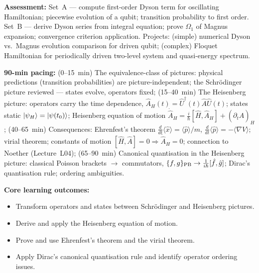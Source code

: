 \documentclass[11pt,a4paper]{article}
\begin{document}
\begin{tcolorbox}[modulebox, title={Module~I.3 / L06: Time Evolution II --- Time-Dependent and Non-Commuting Hamiltonians}]
\medskip\textbf{Assessment:}
Set~A --- compute first-order Dyson term for oscillating Hamiltonian;
piecewise evolution of a qubit; transition probability to first order.
Set~B --- derive Dyson series from integral equation; prove $\Omega_1$ of
Magnus expansion; convergence criterion application.
Projects: (simple) numerical Dyson vs.\ Magnus evolution comparison for driven qubit;
(complex) Floquet Hamiltonian for periodically driven two-level system and
quasi-energy spectrum.
\end{tcolorbox}

\medskip
\begin{tcolorbox}[modulebox, title={Module~I.3 / L07: Pictures of Quantum Mechanics and the Heisenberg Picture}]
\textbf{90-min pacing:} (0--15~min) The equivalence-class of pictures:
physical predictions (transition probabilities) are picture-independent;
the Schr\"odinger picture reviewed --- states evolve, operators fixed;
(15--40~min) The Heisenberg picture: operators carry the time dependence,
$\hat{A}_H(t)=\hat{U}^\dagger(t)\hat{A}\hat{U}(t)$; states static
$\ket{\psi_H}=\ket{\psi(t_0)}$; Heisenberg equation of motion
$\dot{\hat{A}}_H = \tfrac{i}{\hbar}[\hat{H},\hat{A}_H]+(\partial_t\hat{A})_H$;
(40--65~min) Consequences: Ehrenfest's theorem
$\tfrac{d}{dt}\langle\hat{x}\rangle=\langle\hat{p}\rangle/m$,
$\tfrac{d}{dt}\langle\hat{p}\rangle=-\langle\nabla V\rangle$;
virial theorem; constants of motion $[\hat{H},\hat{A}]=0\Rightarrow\dot{\hat{A}}_H=0$;
connection to Noether (Lecture~L04);
(65--90~min) Canonical quantisation in the Heisenberg picture:
classical Poisson brackets $\to$ commutators,
$\{f,g\}_{\rm PB}\to\tfrac{1}{i\hbar}[\hat{f},\hat{g}]$;
Dirac's quantisation rule; ordering ambiguities.

\medskip\textbf{Core learning outcomes:}
\begin{itemize}[leftmargin=1.4em,topsep=2pt,itemsep=1pt]
  \item Transform operators and states between Schr\"odinger and Heisenberg pictures.
  \item Derive and apply the Heisenberg equation of motion.
  \item Prove and use Ehrenfest's theorem and the virial theorem.
  \item Apply Dirac's canonical quantisation rule and identify operator ordering issues.
\end{itemize}


\end{tcolorbox}
\end{document}

